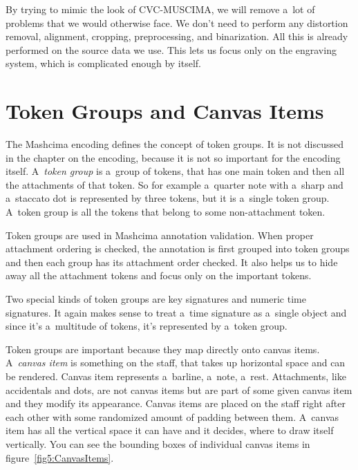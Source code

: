 By trying to mimic the look of CVC-MUSCIMA, we will remove a~lot of problems that we would otherwise face. We don't need to perform any distortion removal, alignment, cropping, preprocessing, and binarization. All this is already performed on the source data we use. This lets us focus only on the engraving system, which is complicated enough by itself.


\section{Token Groups and Canvas Items}

The Mashcima encoding defines the concept of token groups. It is not discussed in the chapter on the encoding, because it is not so important for the encoding itself. A~\emph{token group} is a~group of tokens, that has one main token and then all the attachments of that token. So for example a~quarter note with a~sharp and a~staccato dot is represented by three tokens, but it is a~single token group. A~token group is all the tokens that belong to some non-attachment token.

Token groups are used in Mashcima annotation validation. When proper attachment ordering is checked, the annotation is first grouped into token groups and then each group has its attachment order checked. It also helps us to hide away all the attachment tokens and focus only on the important tokens.

Two special kinds of token groups are key signatures and numeric time signatures. It again makes sense to treat a~time signature as a~single object and since it's a~multitude of tokens, it's represented by a~token group.

Token groups are important because they map directly onto canvas items. A~\emph{canvas item} is something on the staff, that takes up horizontal space and can be rendered. Canvas item represents a~barline, a~note, a~rest. Attachments, like accidentals and dots, are not canvas items but are part of some given canvas item and they modify its appearance. Canvas items are placed on the staff right after each other with some randomized amount of padding between them. A~canvas item has all the vertical space it can have and it decides, where to draw itself vertically. You can see the bounding boxes of individual canvas items in figure~\ref{fig5:CanvasItems}.

